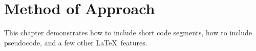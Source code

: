 %
%
%
\chapter{Method of Approach} \label{ch:method}
This chapter demonstrates how to include short code segments,
how to include pseudocode, and a few other \LaTeX\ features.


% 


